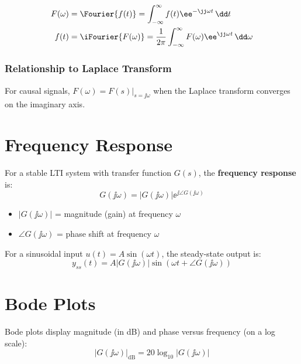 \begin{definitionbox}[title=Definition 0.4: Fourier Transform]
\begin{align}
F(\omega) &= \Fourier\{f(t)\} = \int_{-\infty}^{\infty} f(t) \ee^{-\jj\omega t} \, \dd t \\
f(t) &= \iFourier\{F(\omega)\} = \frac{1}{2\pi} \int_{-\infty}^{\infty} F(\omega) \ee^{\jj\omega t} \, \dd\omega
\end{align}
\end{definitionbox}

\subsubsection{Relationship to Laplace Transform}
For causal signals, $F(\omega) = F(s)|_{s=\jj\omega}$ when the Laplace transform converges on the imaginary axis.

\section{Frequency Response}

For a stable LTI system with transfer function $G(s)$, the \textbf{frequency response} is:
\begin{equation}
G(\jj\omega) = |G(\jj\omega)| \ee^{\jj\angle G(\jj\omega)}
\end{equation}

\begin{itemize}
    \item $|G(\jj\omega)|$ = magnitude (gain) at frequency $\omega$
    \item $\angle G(\jj\omega)$ = phase shift at frequency $\omega$
\end{itemize}

For a sinusoidal input $u(t) = A\sin(\omega t)$, the steady-state output is:
\begin{equation}
y_{ss}(t) = A|G(\jj\omega)|\sin(\omega t + \angle G(\jj\omega))
\end{equation}

\section{Bode Plots}

Bode plots display magnitude (in dB) and phase versus frequency (on a log scale):
\begin{equation}
|G(\jj\omega)|_{\text{dB}} = 20\log_{10}|G(\jj\omega)|
\end{equation}

